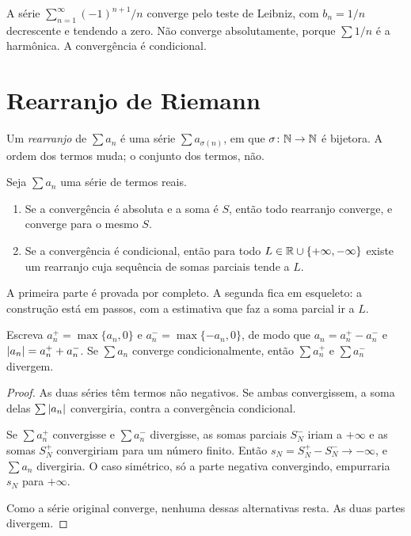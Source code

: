 \documentclass[11pt,a4paper]{article}
\begin{document}
\begin{exemplo}
A série \(\sum_{n=1}^\infty (-1)^{n+1}/n\) converge pelo teste de Leibniz, com \(b_n=1/n\) decrescente e tendendo a zero. Não converge absolutamente, porque \(\sum 1/n\) é a harmônica. A convergência é condicional.
\end{exemplo}

\section{Rearranjo de Riemann}

Um \emph{rearranjo} de \(\sum a_n\) é uma série \(\sum a_{\sigma(n)}\), em que \(\sigma\colon\mathbb{N}\to\mathbb{N}\) é bijetora. A ordem dos termos muda; o conjunto dos termos, não.

\begin{teorema}[Riemann]
Seja \(\sum a_n\) uma série de termos reais.
\begin{enumerate}
\item Se a convergência é absoluta e a soma é \(S\), então todo rearranjo converge, e converge para o mesmo \(S\).
\item Se a convergência é condicional, então para todo \(L\in\mathbb{R}\cup\{+\infty,-\infty\}\) existe um rearranjo cuja sequência de somas parciais tende a \(L\).
\end{enumerate}
\end{teorema}

A primeira parte é provada por completo. A segunda fica em esqueleto: a construção está em passos, com a estimativa que faz a soma parcial ir a \(L\).

\begin{lema}
\label{lem:partes}
Escreva \(a_n^+=\max\{a_n,0\}\) e \(a_n^-=\max\{-a_n,0\}\), de modo que \(a_n=a_n^+-a_n^-\) e \(\left\lvert a_n \right\rvert=a_n^++a_n^-\). Se \(\sum a_n\) converge condicionalmente, então \(\sum a_n^+\) e \(\sum a_n^-\) divergem.
\end{lema}

\begin{proof}
As duas séries têm termos não negativos. Se ambas convergissem, a soma delas \(\sum\left\lvert a_n \right\rvert\) convergiria, contra a convergência condicional.

Se \(\sum a_n^+\) convergisse e \(\sum a_n^-\) divergisse, as somas parciais \(S_N^-\) iriam a \(+\infty\) e as somas \(S_N^+\) convergiriam para um número finito. Então \(s_N=S_N^+-S_N^-\to-\infty\), e \(\sum a_n\) divergiria. O caso simétrico, só a parte negativa convergindo, empurraria \(s_N\) para \(+\infty\).

Como a série original converge, nenhuma dessas alternativas resta. As duas partes divergem.
\end{proof}
\end{document}
